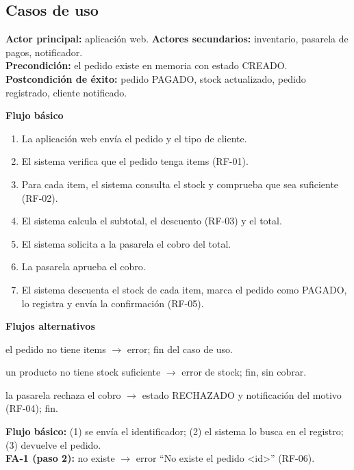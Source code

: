 \documentclass[11pt,a4paper,oneside]{report}
\begin{document}
\subsection{Casos de uso}
\begin{tcolorbox}[colback=white,colframe=primario,fonttitle=\bfseries,title={CU-01 -- Procesar pedido},arc=2pt,boxrule=0.6pt,breakable]
\small
\textbf{Actor principal:} aplicación web. \quad \textbf{Actores secundarios:} inventario, pasarela de pagos, notificador.\\
\textbf{Precondición:} el pedido existe en memoria con estado CREADO.\\
\textbf{Postcondición de éxito:} pedido PAGADO, stock actualizado, pedido registrado, cliente notificado.

\textbf{Flujo básico}
\begin{enumerate}[itemsep=0pt]
  \item La aplicación web envía el pedido y el tipo de cliente.
  \item El sistema verifica que el pedido tenga items (RF-01).
  \item Para cada item, el sistema consulta el stock y comprueba que sea suficiente (RF-02).
  \item El sistema calcula el subtotal, el descuento (RF-03) y el total.
  \item El sistema solicita a la pasarela el cobro del total.
  \item La pasarela aprueba el cobro.
  \item El sistema descuenta el stock de cada item, marca el pedido como PAGADO, lo registra y envía la confirmación (RF-05).
\end{enumerate}
\textbf{Flujos alternativos}
\begin{description}[itemsep=0pt]
  \item[FA-1 (paso 2):] el pedido no tiene items $\rightarrow$ error; fin del caso de uso.
  \item[FA-2 (paso 3):] un producto no tiene stock suficiente $\rightarrow$ error de stock; fin, sin cobrar.
  \item[FA-3 (paso 6):] la pasarela rechaza el cobro $\rightarrow$ estado RECHAZADO y notificación del motivo (RF-04); fin.
\end{description}
\end{tcolorbox}

\begin{tcolorbox}[colback=white,colframe=primario,fonttitle=\bfseries,title={CU-02 -- Consultar pedido},arc=2pt,boxrule=0.6pt]
\small
\textbf{Flujo básico:} (1) se envía el identificador; (2) el sistema lo busca en el registro; (3) devuelve el pedido.\\
\textbf{FA-1 (paso 2):} no existe $\rightarrow$ error ``No existe el pedido <id>'' (RF-06).
\end{tcolorbox}
\end{document}
